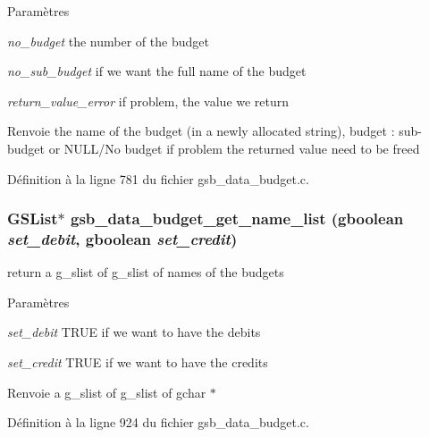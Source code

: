 \begin{DoxyParams}{Paramètres}
\item[{\em no\_\-budget}]the number of the budget \item[{\em no\_\-sub\_\-budget}]if we want the full name of the budget \item[{\em return\_\-value\_\-error}]if problem, the value we return\end{DoxyParams}
\begin{DoxyReturn}{Renvoie}
the name of the budget (in a newly allocated string), budget : sub-\/budget or NULL/No budget if problem the returned value need to be freed 
\end{DoxyReturn}


Définition à la ligne 781 du fichier gsb\_\-data\_\-budget.c.

\subsubsection[{gsb\_\-data\_\-budget\_\-get\_\-name\_\-list}]{\setlength{\rightskip}{0pt plus 5cm}GSList$\ast$ gsb\_\-data\_\-budget\_\-get\_\-name\_\-list (gboolean {\em set\_\-debit}, \/  gboolean {\em set\_\-credit})}\label{gsb__data__budget_8c_a1478a23010fb605611356e0966dabca3}
return a g\_\-slist of g\_\-slist of names of the budgets


\begin{DoxyParams}{Paramètres}
\item[{\em set\_\-debit}]TRUE if we want to have the debits \item[{\em set\_\-credit}]TRUE if we want to have the credits\end{DoxyParams}
\begin{DoxyReturn}{Renvoie}
a g\_\-slist of g\_\-slist of gchar $\ast$ 
\end{DoxyReturn}


Définition à la ligne 924 du fichier gsb\_\-data\_\-budget.c.

